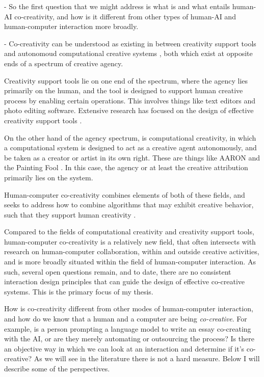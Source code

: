 - So the first question that we might address is what is and what entails human-AI co-creativity, and how is it different from other types of human-AI and human-computer interaction more broadly.

- Co-creativity can be understood as existing in between creativity support tools and autonomoud computational creative systems \cite{Kantosalo2019-pz, Deterding2017-wh}, both which exist at opposite ends of a spectrum of creative agency. 

Creativity support tools lie on one end of the spectrum, where the agency lies primarily on the human, and the tool is designed to support human creative process by enabling certain operations. This involves things like text editors and photo editing software. Extensive research has focused on the design of effective creativity support tools \cite{Shneiderman2006-di, Shneiderman2007-yh, Cherry2014-ty, Chung2021-kc, Resnick2005-fs}. 
 
 On the other hand of the agency spectrum, is computational creativity, in which a computational system is designed to act as a creative agent autonomously, and be taken as a creator or artist in its own right. These are things like AARON \cite{Cohen1995-wt} and the Painting Fool \cite{Colton2015-qr}. In this case, the agency or at least the creative attribution primarily lies on the system. 

Human-computer co-creativity combines elements of both of these fields, and seeks to address how to combine algorithms that may exhibit creative behavior, such that they support human creativity \cite{Kantosalo2019-pz, Deterding2017-wh}. 

Compared to the fields of computational creativity and creativity support tools, human-computer co-creativity is a relatively new field, that often intersects with research on human-computer collaboration, within and outside creative activities, and is more broadly situated within the field of human-computer interaction. As such, several open questions remain, and to date, there are no consistent interaction design principles that can guide the design of effective co-creative systems. This is the primary focus of my thesis. 

 How is co-creativity different from other modes of human-computer interaction, and how do we know that a human and a computer are being \textit{co-creative}. For example, is a person prompting a language model to write an essay co-creating with the AI, or are they merely automating or outsourcing the process? Is there an objective way in which we can look at an interaction and determine if it's co-creative? As we will see in the literature there is not a hard measure. Below I will describe some of the perspectives. 

